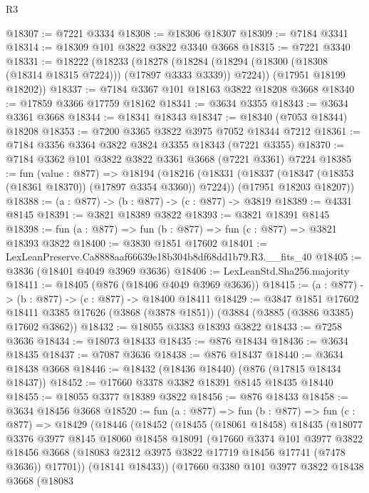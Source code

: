 \begin{lexlean}{R3}
\begin{coremodule}
@18307 := @7221 @3334
@18308 := @18306 @18307
@18309 := @7184 @3341
@18314 := @18309 @101 @3822 @3822 @3340 @3668
@18315 := @7221 @3340
@18331 := @18222
    (@18233
      (@18278 (@18284 (@18294 (@18300 (@18308 (@18314 @18315 @7224))) (@17897 @3333 @3339)) @7224))
      (@17951 @18199 @18202))
@18337 := @7184 @3367 @101 @18163 @3822 @18208 @3668
@18340 := @17859 @3366 @17759 @18162
@18341 := @3634 @3355
@18343 := @3634 @3361 @3668
@18344 := @18341 @18343
@18347 := @18340 (@7053 @18344) @18208
@18353 := @7200 @3365 @3822 @3975 @7052 @18344 @7212
@18361 := @7184 @3356 @3364 @3822 @3824 @3355 @18343 (@7221 @3355)
@18370 := @7184 @3362 @101 @3822 @3822 @3361 @3668 (@7221 @3361) @7224
@18385 := fun (value : @877) =>
  @18194
    (@18216
      (@18331 (@18337 (@18347 (@18353 (@18361 @18370)) (@17897 @3354 @3360)) @7224))
      (@17951 @18203 @18207))
@18388 := (a : @877) -> (b : @877) -> (c : @877) -> @3819
@18389 := @4331 @8145
@18391 := @3821 @18389 @3822
@18393 := @3821 @18391 @8145
@18398 := fun (a : @877) => fun (b : @877) => fun (c : @877) => @3821 @18393 @3822
@18400 := @3830 @1851 @17602
@18401 := LexLeanPreserve.Ca8888aaf66639e18b304b8df68dd1b79.R3.__fits_40
@18405 := @3836 (@18401 @4049 @3969 @3636)
@18406 := LexLeanStd.Sha256.majority
@18411 := @18405 (@876 (@18406 @4049 @3969 @3636))
@18415 := (a : @877) -> (b : @877) -> (c : @877) -> @18400 @18411
@18429 := @3847
    @1851
    @17602
    @18411
    @3385
    @17626
    (@3868 (@3878 @1851))
    (@3884 (@3885 (@3886 @3385) @17602 @3862))
@18432 := @18055 @3383 @18393 @3822
@18433 := @7258 @3636
@18434 := @18073 @18433
@18435 := @876 @18434
@18436 := @3634 @18435
@18437 := @7087 @3636
@18438 := @876 @18437
@18440 := @3634 @18438 @3668
@18446 := @18432 (@18436 @18440) (@876 (@17815 @18434 @18437))
@18452 := @17660 @3378 @3382 @18391 @8145 @18435 @18440
@18455 := @18055 @3377 @18389 @3822
@18456 := @876 @18433
@18458 := @3634 @18456 @3668
@18520 := fun (a : @877) =>
  fun (b : @877) =>
  fun (c : @877) =>
  @18429
    (@18446
      (@18452
        (@18455
          (@18061 @18458)
          @18435
          (@18077
            @3376
            @3977
            @8145
            @18060
            @18458
            @18091
            (@17660
              @3374
              @101
              @3977
              @3822
              @18456
              @3668
              (@18083 @2312 @3975 @3822 @17719 @18456 @17741 (@7478 @3636))
              @17701))
          (@18141 @18433))
        (@17660
          @3380
          @101
          @3977
          @3822
          @18438
          @3668
          (@18083

\end{coremodule}
\end{lexlean}
